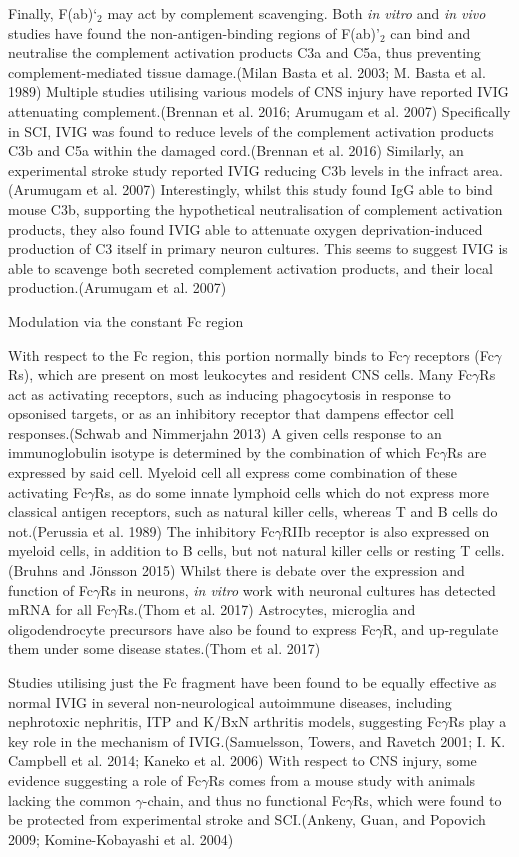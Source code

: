 \documentclass[9pt,lineno]{elife}
\begin{document}
Finally, F(ab)`\(_2\) may act by complement scavenging.
Both \emph{in vitro} and \emph{in vivo} studies have found the non-antigen-binding regions of F(ab)'\(_2\) can bind and neutralise the complement activation products C3a and C5a, thus preventing complement-mediated tissue damage.(Milan Basta et al. 2003; M. Basta et al. 1989)
Multiple studies utilising various models of CNS injury have reported IVIG attenuating complement.(Brennan et al. 2016; Arumugam et al. 2007)
Specifically in SCI, IVIG was found to reduce levels of the complement activation products C3b and C5a within the damaged cord.(Brennan et al. 2016)
Similarly, an experimental stroke study reported IVIG reducing C3b levels in the infract area.(Arumugam et al. 2007)
Interestingly, whilst this study found IgG able to bind mouse C3b, supporting the hypothetical neutralisation of complement activation products, they also found IVIG able to attenuate oxygen deprivation-induced production of C3 itself in primary neuron cultures.
This seems to suggest IVIG is able to scavenge both secreted complement activation products, and their local production.(Arumugam et al. 2007)

Modulation via the constant Fc region

With respect to the Fc region, this portion normally binds to Fc\(\gamma\) receptors (Fc\(\gamma\)Rs), which are present on most leukocytes and resident CNS cells.
Many Fc\(\gamma\)Rs act as activating receptors, such as inducing phagocytosis in response to opsonised targets, or as an inhibitory receptor that dampens effector cell responses.(Schwab and Nimmerjahn 2013)
A given cells response to an immunoglobulin isotype is determined by the combination of which Fc\(\gamma\)Rs are expressed by said cell.
Myeloid cell all express come combination of these activating Fc\(\gamma\)Rs, as do some innate lymphoid cells which do not express more classical antigen receptors, such as natural killer cells, whereas T and B cells do not.(Perussia et al. 1989)
The inhibitory Fc\(\gamma\)RIIb receptor is also expressed on myeloid cells, in addition to B cells, but not natural killer cells or resting T cells.(Bruhns and Jönsson 2015)
Whilst there is debate over the expression and function of Fc\(\gamma\)Rs in neurons, \emph{in vitro} work with neuronal cultures has detected mRNA for all Fc\(\gamma\)Rs.(Thom et al. 2017)
Astrocytes, microglia and oligodendrocyte precursors have also be found to express Fc\(\gamma\)R, and up-regulate them under some disease states.(Thom et al. 2017)

Studies utilising just the Fc fragment have been found to be equally effective as normal IVIG in several non-neurological autoimmune diseases, including nephrotoxic nephritis, ITP and K/BxN arthritis models, suggesting Fc\(\gamma\)Rs play a key role in the mechanism of IVIG.(Samuelsson, Towers, and Ravetch 2001; I. K. Campbell et al. 2014; Kaneko et al. 2006)
With respect to CNS injury, some evidence suggesting a role of Fc\(\gamma\)Rs comes from a mouse study with animals lacking the common \(\gamma\)-chain, and thus no functional Fc\(\gamma\)Rs, which were found to be protected from experimental stroke and SCI.(Ankeny, Guan, and Popovich 2009; Komine-Kobayashi et al. 2004)
\end{document}
